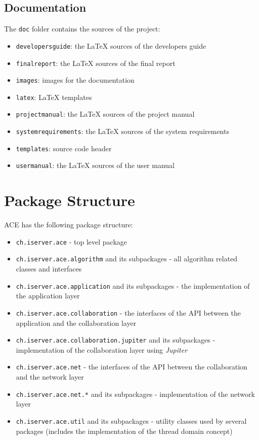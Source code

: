 \documentclass[11pt,a4paper]{article}
\begin{document}
\subsection{Documentation}
The \texttt{doc} folder contains the sources of the project:

\begin{itemize}
 \item \texttt{developersguide}: the \LaTeX{} sources of the developers guide
 \item \texttt{finalreport}: the \LaTeX{} sources of the final report
 \item \texttt{images}: images for the documentation
 \item \texttt{latex}: \LaTeX{} templates
 \item \texttt{projectmanual}: the \LaTeX{} sources of the project manual
 \item \texttt{systemrequirements}: the \LaTeX{} sources of the system requirements
 \item \texttt{templates}: source code header
 \item \texttt{usermanual}: the \LaTeX{} sources of the user manual
\end{itemize}



\section{Package Structure}
ACE has the following package structure:

\begin{itemize}
 \item \texttt{ch.iserver.ace} - top level package
 \item \texttt{ch.iserver.ace.algorithm} and its subpackages - all algorithm related classes and interfaces
 \item \texttt{ch.iserver.ace.application} and its subpackages - the implementation of the application layer
 \item \texttt{ch.iserver.ace.collaboration} - the interfaces of the API between the application and the collaboration layer
 \item \texttt{ch.iserver.ace.collaboration.jupiter} and its subpackages - implementation of the collaboration layer using \emph{Jupiter}
 \item \texttt{ch.iserver.ace.net} - the interfaces of the API between the collaboration and the network layer
 \item \texttt{ch.iserver.ace.net.*} and its subpackages - implementation of the network layer
 \item \texttt{ch.iserver.ace.util} and its subpackages - utility classes used by several packages (includes the implementation of the thread domain concept)
\end{itemize}
\end{document}
